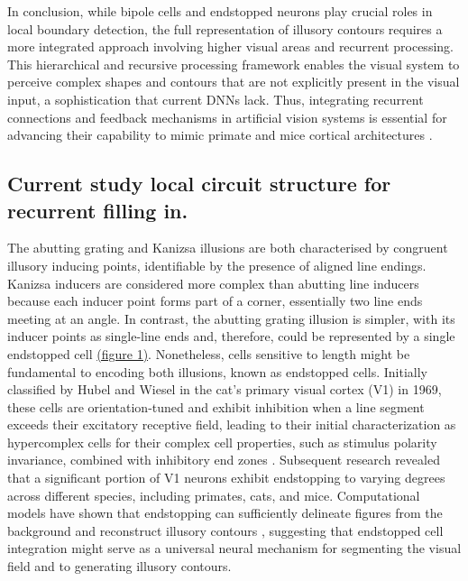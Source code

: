 \documentclass[12pt]{article}
\begin{document}
In conclusion, while bipole cells and endstopped neurons play crucial roles in local boundary detection, the full representation of illusory contours requires a more integrated approach involving higher visual areas and recurrent processing. This hierarchical and recursive processing framework enables the visual system to perceive complex shapes and contours that are not explicitly present in the visual input, a sophistication that current DNNs lack. Thus, integrating recurrent connections and feedback mechanisms in artificial vision systems is essential for advancing their capability to mimic primate and mice cortical architectures \autocite{grossbergHowVisualIllusions2014,grossbergTextureSegregationSurface1998}. 

\subsection{Current study local circuit structure for recurrent filling in.}
The abutting grating and Kanizsa illusions are both characterised by congruent illusory inducing points, identifiable by the presence of aligned line endings. Kanizsa inducers are considered more complex than abutting line inducers because each inducer point forms part of a corner, essentially two line ends meeting at an angle. In contrast, the abutting grating illusion is simpler, with its inducer points as single-line ends and, therefore, could be represented by a single endstopped cell \hyperref[fig:figure_1]{(figure 1)}.
Nonetheless, cells sensitive to length might be fundamental to encoding both illusions, known as endstopped cells. Initially classified by Hubel and Wiesel in the cat's primary visual cortex (V1) in 1969, these cells are orientation-tuned and exhibit inhibition when a line segment exceeds their excitatory receptive field, leading to their initial characterization as hypercomplex cells for their complex cell properties, such as stimulus polarity invariance, combined with inhibitory end zones \autocite{hubelRECEPTIVEFIELDSFUNCTIONAL1965}. Subsequent research revealed that a significant portion of V1 neurons exhibit endstopping to varying degrees  \autocite{deangelisLengthWidthTuning1994,jonesSurroundSuppressionPrimate2001,sceniakVisualSpatialCharacterization2001} across different species, including primates, cats, and mice. Computational models have shown that endstopping can sufficiently delineate figures from the background and reconstruct illusory contours \autocite{vonderheydtMechanismsContourPerception1989}, suggesting that endstopped cell integration might serve as a universal neural mechanism for segmenting the visual field and to generating illusory contours.
\end{document}
